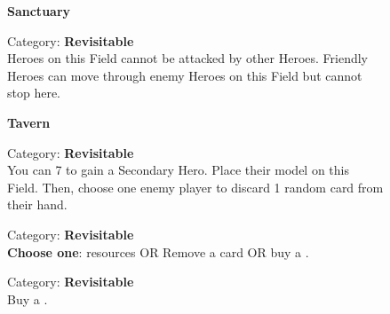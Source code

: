 \begin{figure}[H]
  \begin{minipage}[t]{0.47\textwidth}
    \vspace{0pt}
    \centering
    \textbf{Sanctuary}\par
    \caption{\small Category: \textbf{Revisitable}\\
      Heroes on this Field cannot be attacked by other Heroes.
      Friendly Heroes can move through enemy Heroes on this Field but cannot stop here.}
  \end{minipage}\hfill
  \begin{minipage}[t]{0.47\textwidth}
    \vspace{0pt}
    \centering
    \phantom{j}\textbf{Tavern}\par
    \caption{\small Category: \textbf{Revisitable}\\
      You can 
      7 
      to gain a Secondary Hero.
      Place their model on this Field.
      Then, choose one enemy player to discard 1 random card from their hand.}
  \end{minipage}
\end{figure}

\begin{figure}[H]
  \begin{minipage}[t]{0.47\textwidth}
    \vspace{0pt}
    \centering
    \par
    \caption{\small Category: \textbf{Revisitable}\\
      \textbf{Choose one}: \protect{} resources OR Remove a card OR buy a \protect{}.
    }
  \end{minipage}\hfill
  \begin{minipage}[t]{0.47\textwidth}
    \vspace{0pt}
    \centering
    \phantom{j}\par
    \caption{\small Category: \textbf{Revisitable}\\Buy a \protect{}.\phantom{.......}}
  \end{minipage}
\end{figure}

